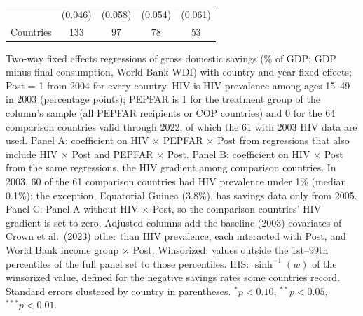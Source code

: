 \begin{table}[htbp]
\begin{tabular}{lcccc}
 & (0.046) & (0.058) & (0.054) & (0.061) \\
Countries & 133 & 97 & 78 & 53 \\
\bottomrule
\end{tabular}
\par\vspace{4pt}
\begin{minipage}{\textwidth}\footnotesize Two-way fixed effects regressions of gross domestic savings (\% of GDP; GDP minus final consumption, World Bank WDI) with country and year fixed effects; Post = 1 from 2004 for every country. HIV is HIV prevalence among ages 15--49 in 2003 (percentage points); PEPFAR is 1 for the treatment group of the column's sample (all PEPFAR recipients or COP countries) and 0 for the 64 comparison countries valid through 2022, of which the 61 with 2003 HIV data are used. Panel A: coefficient on HIV $\times$ PEPFAR $\times$ Post from regressions that also include HIV $\times$ Post and PEPFAR $\times$ Post. Panel B: coefficient on HIV $\times$ Post from the same regressions, the HIV gradient among comparison countries. In 2003, 60 of the 61 comparison countries had HIV prevalence under 1\% (median 0.1\%); the exception, Equatorial Guinea (3.8\%), has savings data only from 2005. Panel C: Panel A without HIV $\times$ Post, so the comparison countries' HIV gradient is set to zero. Adjusted columns add the baseline (2003) covariates of Crown et al.\ (2023) other than HIV prevalence, each interacted with Post, and World Bank income group $\times$ Post. Winsorized: values outside the 1st--99th percentiles of the full panel set to those percentiles. IHS: $\sinh^{-1}(w)$ of the winsorized value, defined for the negative savings rates some countries record. Standard errors clustered by country in parentheses. $^{*}p<0.10$, $^{**}p<0.05$, $^{***}p<0.01$.\end{minipage}
\end{table}
